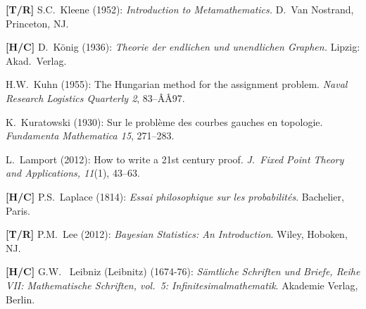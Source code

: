 \begin{thebibliography}{999}
{\bf [T/R]}
S.C.~Kleene (1952):
{\it Introduction to Metamathematics.}
D.~Van Nostrand, Princeton, NJ.


{\bf [H/C]}
D.~K\"onig (1936): {\it Theorie der endlichen und unendlichen Graphen.}  Lipzig: Akad.~Verlag.

H.W.~Kuhn (1955): The Hungarian method for the assignment problem.  {\it Naval Research Logistics Quarterly 2}, 83--ÂÂ97.

K.~Kuratowski (1930):  Sur le probl\`{e}me des courbes gauches en topologie.
{\it Fundamenta Mathematica 15}, 271--283. 




L.~Lamport (2012): How to write a 21st century proof.
{\it J.~Fixed Point Theory and Applications, 11}(1), 43--63.

{\bf [H/C]}
P.S.~Laplace (1814): {\it Essai philosophique sur les probabilit\'{e}s}.  Bachelier, Paris.

{\bf [T/R]}
P.M.~Lee (2012): {\it Bayesian Statistics: An Introduction}.  Wiley, Hoboken, NJ.


{\bf [H/C]}
G.W.~ Leibniz (Leibnitz) (1674-76):
{\it S\"{a}mtliche Schriften und Briefe, Reihe VII: Mathematische Schriften, vol.~5: Infinitesimalmathematik}.  Akademie Verlag, Berlin.


 


\end{thebibliography}
